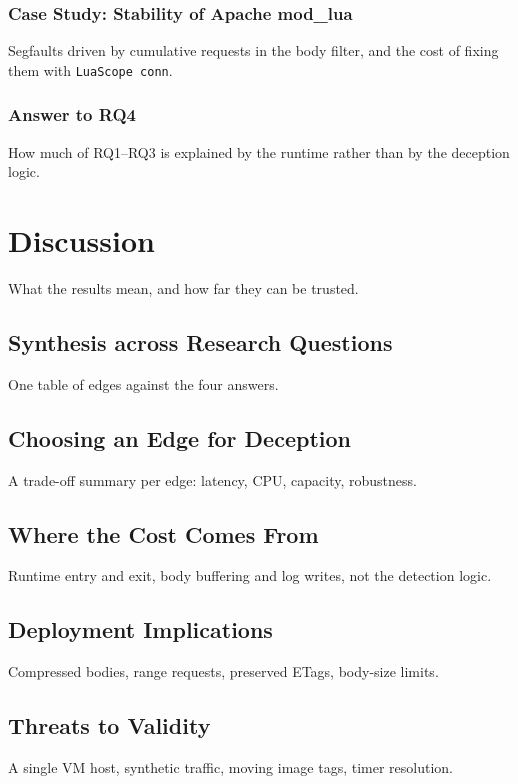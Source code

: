 \documentclass{rptuma}
\begin{document}
\subsection{Case Study: Stability of Apache mod\_lua}
Segfaults driven by cumulative requests in the body filter, and the cost of fixing them with
\texttt{LuaScope conn}.
\subsection{Answer to RQ4}
How much of RQ1--RQ3 is explained by the runtime rather than by the deception logic.

\chapter{Discussion}
What the results mean, and how far they can be trusted.

\section{Synthesis across Research Questions}
One table of edges against the four answers.

\section{Choosing an Edge for Deception}
A trade-off summary per edge: latency, CPU, capacity, robustness.

\section{Where the Cost Comes From}
Runtime entry and exit, body buffering and log writes, not the detection logic.

\section{Deployment Implications}
Compressed bodies, range requests, preserved ETags, body-size limits.

\section{Threats to Validity}
A single VM host, synthetic traffic, moving image tags, timer resolution.
\end{document}
